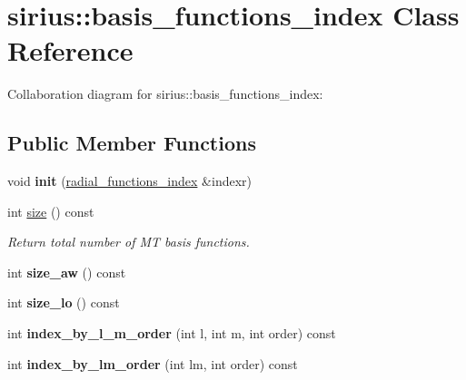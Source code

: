 \hypertarget{classsirius_1_1basis__functions__index}{}\section{sirius\+:\+:basis\+\_\+functions\+\_\+index Class Reference}
\label{classsirius_1_1basis__functions__index}


Collaboration diagram for sirius\+:\+:basis\+\_\+functions\+\_\+index\+:
\subsection*{Public Member Functions}
\begin{DoxyCompactItemize}
\item 
\hypertarget{classsirius_1_1basis__functions__index_a6086d55044ea8996b89a113f4e295802}{}void {\bfseries init} (\hyperlink{classsirius_1_1radial__functions__index}{radial\+\_\+functions\+\_\+index} \&indexr)\label{classsirius_1_1basis__functions__index_a6086d55044ea8996b89a113f4e295802}

\item 
int \hyperlink{classsirius_1_1basis__functions__index_adb605c4f75985a86727506b8c5ba4100}{size} () const 
\begin{DoxyCompactList}\small\item\em Return total number of M\+T basis functions. \end{DoxyCompactList}\item 
\hypertarget{classsirius_1_1basis__functions__index_a68bc043688a894c042133cc861724f9e}{}int {\bfseries size\+\_\+aw} () const \label{classsirius_1_1basis__functions__index_a68bc043688a894c042133cc861724f9e}

\item 
\hypertarget{classsirius_1_1basis__functions__index_a425336b5f51d7f866354b4959f8d39e6}{}int {\bfseries size\+\_\+lo} () const \label{classsirius_1_1basis__functions__index_a425336b5f51d7f866354b4959f8d39e6}

\item 
\hypertarget{classsirius_1_1basis__functions__index_a1474fac86d984a7e67fc3e6d2a837c5e}{}int {\bfseries index\+\_\+by\+\_\+l\+\_\+m\+\_\+order} (int l, int m, int order) const \label{classsirius_1_1basis__functions__index_a1474fac86d984a7e67fc3e6d2a837c5e}

\item 
\hypertarget{classsirius_1_1basis__functions__index_a495ef4d19f194f5be67fb98e573d99bf}{}int {\bfseries index\+\_\+by\+\_\+lm\+\_\+order} (int lm, int order) const \label{classsirius_1_1basis__functions__index_a495ef4d19f194f5be67fb98e573d99bf}


\end{DoxyCompactItemize}
